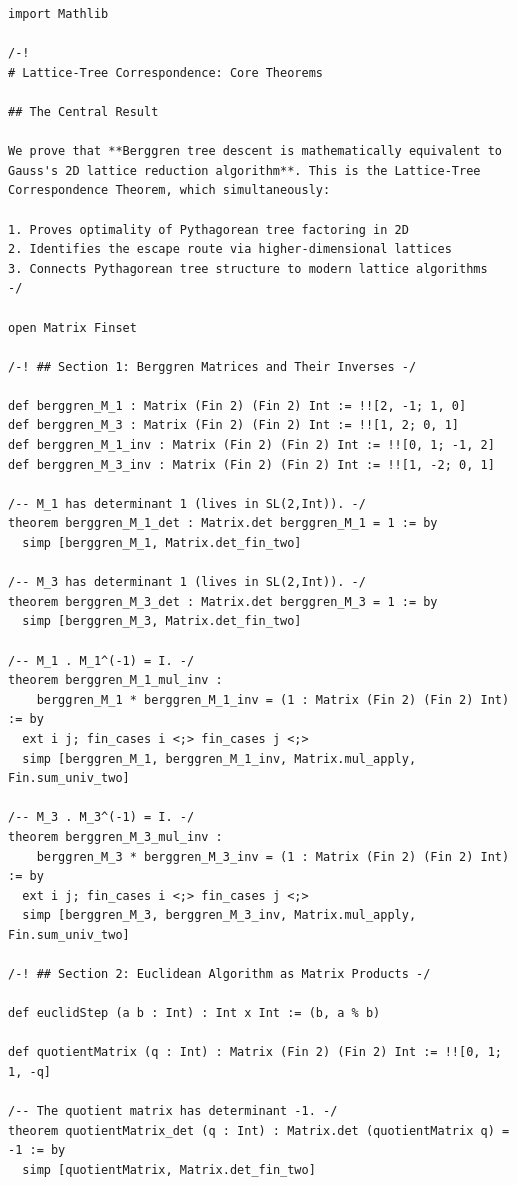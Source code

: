 \documentclass[11pt,openright,twoside]{book}
\theoremstyle{definition}
\begin{document}
\begin{lstlisting}[style=lean]
import Mathlib

/-!
# Lattice-Tree Correspondence: Core Theorems

## The Central Result

We prove that **Berggren tree descent is mathematically equivalent to
Gauss's 2D lattice reduction algorithm**. This is the Lattice-Tree
Correspondence Theorem, which simultaneously:

1. Proves optimality of Pythagorean tree factoring in 2D
2. Identifies the escape route via higher-dimensional lattices
3. Connects Pythagorean tree structure to modern lattice algorithms
-/

open Matrix Finset

/-! ## Section 1: Berggren Matrices and Their Inverses -/

def berggren_M_1 : Matrix (Fin 2) (Fin 2) Int := !![2, -1; 1, 0]
def berggren_M_3 : Matrix (Fin 2) (Fin 2) Int := !![1, 2; 0, 1]
def berggren_M_1_inv : Matrix (Fin 2) (Fin 2) Int := !![0, 1; -1, 2]
def berggren_M_3_inv : Matrix (Fin 2) (Fin 2) Int := !![1, -2; 0, 1]

/-- M_1 has determinant 1 (lives in SL(2,Int)). -/
theorem berggren_M_1_det : Matrix.det berggren_M_1 = 1 := by
  simp [berggren_M_1, Matrix.det_fin_two]

/-- M_3 has determinant 1 (lives in SL(2,Int)). -/
theorem berggren_M_3_det : Matrix.det berggren_M_3 = 1 := by
  simp [berggren_M_3, Matrix.det_fin_two]

/-- M_1 . M_1^(-1) = I. -/
theorem berggren_M_1_mul_inv :
    berggren_M_1 * berggren_M_1_inv = (1 : Matrix (Fin 2) (Fin 2) Int) := by
  ext i j; fin_cases i <;> fin_cases j <;>
  simp [berggren_M_1, berggren_M_1_inv, Matrix.mul_apply, Fin.sum_univ_two]

/-- M_3 . M_3^(-1) = I. -/
theorem berggren_M_3_mul_inv :
    berggren_M_3 * berggren_M_3_inv = (1 : Matrix (Fin 2) (Fin 2) Int) := by
  ext i j; fin_cases i <;> fin_cases j <;>
  simp [berggren_M_3, berggren_M_3_inv, Matrix.mul_apply, Fin.sum_univ_two]

/-! ## Section 2: Euclidean Algorithm as Matrix Products -/

def euclidStep (a b : Int) : Int x Int := (b, a % b)

def quotientMatrix (q : Int) : Matrix (Fin 2) (Fin 2) Int := !![0, 1; 1, -q]

/-- The quotient matrix has determinant -1. -/
theorem quotientMatrix_det (q : Int) : Matrix.det (quotientMatrix q) = -1 := by
  simp [quotientMatrix, Matrix.det_fin_two]


\end{lstlisting}
\end{document}
